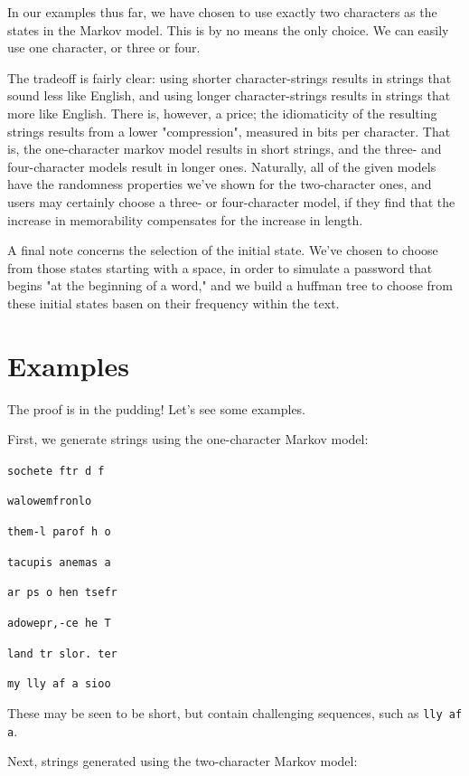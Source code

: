 \documentclass[preprint]{soups}
\newcommand{\sectionNewpage}{}
\newcommand{\Scribtexttt}[1]{{\texttt{#1}}}
\newenvironment{SingleColumn}{\begin{list}{}{\topsep=0pt\partopsep=0pt%
\listparindent=0pt\itemindent=0pt\labelwidth=0pt\leftmargin=0pt\rightmargin=0pt%
\itemsep=0pt\parsep=0pt}\item}{\end{list}}
\let\SOriginalthesubsection\thesubsection
\newcommand{\Ssection}[2]{\section[#1]{#2}\let\thesubsection\SOriginalthesubsection}
\begin{document}
In our examples thus far, we have chosen to use exactly two
characters as the states in the Markov model.  This is by no
means the only choice. We can easily use one character, or
three or four.

The tradeoff is fairly clear: using shorter
character{-}strings results in strings that sound less like
English, and using longer character{-}strings results in
strings that more like English. There is, however, a price;
the idiomaticity of the resulting strings results from a
lower "compression", measured in bits per character. That
is, the one{-}character markov model results in short strings,
and the three{-} and four{-}character models result in longer
ones. Naturally, all of the given models have the randomness
properties we{'}ve shown for the two{-}character ones, and users
may certainly choose a three{-} or four{-}character model, if
they find that the increase in memorability compensates for
the increase in length.

A final note concerns the selection of the initial state.
We{'}ve chosen to choose from those states starting with a
space, in order to simulate a password that begins "at the
beginning of a word," and we build a huffman tree to choose
from these initial states basen on their frequency within
the text.

\sectionNewpage

\Ssection{Examples}{Examples}\label{t:x28part_x22Examplesx22x29}

The proof is in the pudding! Let{'}s see some examples.

First, we generate strings using the one{-}character Markov model:

\begin{SingleColumn}\Scribtexttt{sochete ftr d f}

\Scribtexttt{walowemfronlo}

\Scribtexttt{them{-}l parof h o}

\Scribtexttt{tacupis anemas a}

\Scribtexttt{ar ps o hen tsefr}

\Scribtexttt{adowepr,{-}ce he T}

\Scribtexttt{land tr slor{\hbox{\texttt{.}}} ter}

\Scribtexttt{my lly af a sioo}\end{SingleColumn}

These may be seen to be short, but contain challenging
sequences, such as \Scribtexttt{lly af a}.

Next, strings generated using the two{-}character Markov model:
\end{document}
